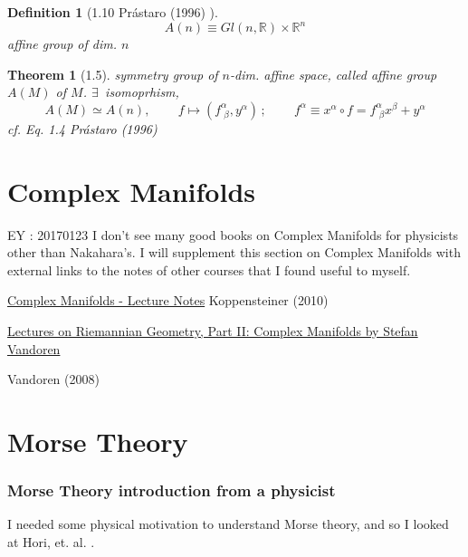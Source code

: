 \documentclass[10pt]{amsart}
\newtheorem{theorem}{Theorem}
\newtheorem{definition}{Definition}
\begin{document}
\begin{multicols*}{2}
\begin{definition}[1.10 Pr\'{a}staro (1996) \cite{Pras1996}]
  \begin{equation}
    A(n) \equiv Gl(n,\mathbb{R}) \times \mathbb{R}^n
  \end{equation}
  affine group of dim. $n$
  \end{definition}

\begin{theorem}[1.5] symmetry group of $n$-dim. affine space, called affine group $A(M)$ of $M$.  $\exists \, $ isomoprhism,
  \begin{equation}
    A(M) \simeq A(n), \qquad \, f\mapsto (f^{\alpha}_{ \, \, \beta} , y^{\alpha}) \, ; \qquad \, f^{\alpha} \equiv x^{\alpha} \circ f = f^{\alpha}_{ \, \, \beta} x^{\beta} + y^{\alpha}
  \end{equation}
cf. Eq. 1.4 Pr\'{a}staro (1996) \cite{Pras1996}
  \end{theorem}



\part{Complex Manifolds}

EY : 20170123 I don't see many good books on Complex Manifolds for physicists other than Nakahara's.  I will supplement this section on Complex Manifolds with external links to the notes of other courses that I found useful to myself.


\href{http://www.caramdir.at/uploads/math/piii-cm/complex-manifolds.pdf}{Complex Manifolds - Lecture Notes}
Koppensteiner (2010) \cite{Kopp2010}


\href{http://www.staff.science.uu.nl/~vando101/MRIlectures.pdf}{Lectures on Riemannian Geometry, Part II: Complex Manifolds by Stefan Vandoren}

Vandoren (2008) \cite{Vand2008}


\part{Morse Theory}

\section{Morse Theory introduction from a physicist}

I needed some physical motivation to understand Morse theory, and so I looked at Hori, et. al. \cite{Hori2003}.  


\end{multicols*}
\end{document}
